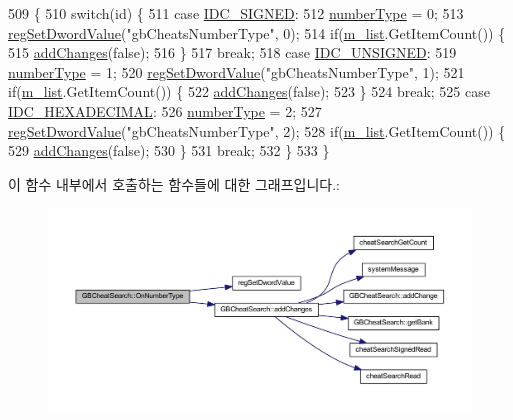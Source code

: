 \begin{DoxyCode}
509 \{
510   \textcolor{keywordflow}{switch}(\textcolor{keywordtype}{id}) \{
511   \textcolor{keywordflow}{case} \mbox{\hyperlink{resource_8h_ae13e01a62e7c40be0e3a93d98d2cd1d3}{IDC\_SIGNED}}:
512     \mbox{\hyperlink{class_g_b_cheat_search_aff51de1046c650805a8b749aa8df9cad}{numberType}} = 0;
513     \mbox{\hyperlink{_reg_8cpp_a758e775489a3fb5c3cc7071fdd5af87e}{regSetDwordValue}}(\textcolor{stringliteral}{"gbCheatsNumberType"}, 0);
514     \textcolor{keywordflow}{if}(\mbox{\hyperlink{class_g_b_cheat_search_a4385c178810aafb751e2bbc80a1a67c3}{m\_list}}.GetItemCount()) \{
515       \mbox{\hyperlink{class_g_b_cheat_search_a10b0314fc3b27cda2e217539c9c1e052}{addChanges}}(\textcolor{keyword}{false});
516     \}
517     \textcolor{keywordflow}{break};
518   \textcolor{keywordflow}{case} \mbox{\hyperlink{resource_8h_aeedbb412500d742d9253c77868e55102}{IDC\_UNSIGNED}}:
519     \mbox{\hyperlink{class_g_b_cheat_search_aff51de1046c650805a8b749aa8df9cad}{numberType}} = 1;
520     \mbox{\hyperlink{_reg_8cpp_a758e775489a3fb5c3cc7071fdd5af87e}{regSetDwordValue}}(\textcolor{stringliteral}{"gbCheatsNumberType"}, 1);
521     \textcolor{keywordflow}{if}(\mbox{\hyperlink{class_g_b_cheat_search_a4385c178810aafb751e2bbc80a1a67c3}{m\_list}}.GetItemCount()) \{
522       \mbox{\hyperlink{class_g_b_cheat_search_a10b0314fc3b27cda2e217539c9c1e052}{addChanges}}(\textcolor{keyword}{false});
523     \}
524     \textcolor{keywordflow}{break};
525   \textcolor{keywordflow}{case} \mbox{\hyperlink{resource_8h_a41e2d269f242a0163051e37d88a2ee61}{IDC\_HEXADECIMAL}}:
526     \mbox{\hyperlink{class_g_b_cheat_search_aff51de1046c650805a8b749aa8df9cad}{numberType}} = 2;
527     \mbox{\hyperlink{_reg_8cpp_a758e775489a3fb5c3cc7071fdd5af87e}{regSetDwordValue}}(\textcolor{stringliteral}{"gbCheatsNumberType"}, 2);
528     \textcolor{keywordflow}{if}(\mbox{\hyperlink{class_g_b_cheat_search_a4385c178810aafb751e2bbc80a1a67c3}{m\_list}}.GetItemCount()) \{
529       \mbox{\hyperlink{class_g_b_cheat_search_a10b0314fc3b27cda2e217539c9c1e052}{addChanges}}(\textcolor{keyword}{false});
530     \}
531     \textcolor{keywordflow}{break};
532   \}
533 \}
\end{DoxyCode}
이 함수 내부에서 호출하는 함수들에 대한 그래프입니다.\+:
\nopagebreak
\begin{figure}[H]
\begin{center}
\leavevmode
\includegraphics[width=350pt]{class_g_b_cheat_search_a2efda7e683705801f7c40be0ae7e59f2_cgraph}
\end{center}
\end{figure}
